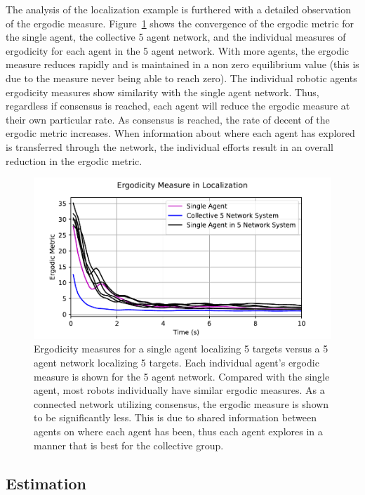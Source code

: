 \documentclass[conference]{IEEEtran}
\begin{document}
The analysis of the localization example is furthered with a detailed observation of the ergodic measure. Figure~\ref{fig:disloc_conv} shows the convergence of the ergodic metric for the single agent, the collective 5 agent network, and the individual measures of ergodicity for each agent in the 5 agent network. With more agents, the ergodic measure reduces rapidly and is maintained in a non zero equilibrium value (this is due to the measure never being able to reach zero). The individual robotic agents ergodicity measures show similarity with the single agent network. Thus, regardless if consensus is reached, each agent will reduce the ergodic measure at their own particular rate. As consensus is reached, the rate of decent of the ergodic metric increases. When information about where each agent has explored is transferred through the network, the individual efforts result in an overall reduction in the ergodic metric.

\begin{figure}[!h]
\centering
\includegraphics[scale=0.5]{figures/localization_convergence.pdf}
\caption{ Ergodicity measures for a single agent localizing 5 targets versus a 5 agent network localizing 5 targets. Each individual agent's ergodic measure is shown for the 5 agent network. Compared with the single agent, most robots individually have similar ergodic measures. As a connected network utilizing consensus, the ergodic measure is shown to be significantly less. This is due to shared information between agents on where each agent has been, thus each agent explores in a manner that is best for the collective group. }
\label{fig:disloc_conv}
\end{figure}

\subsection{Estimation}
\end{document}
